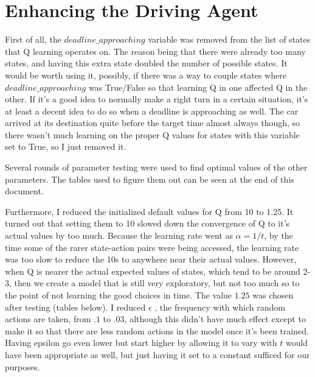 \documentclass{amsart}
\begin{document}
\section{Enhancing the Driving Agent}
First of all, the $deadline\_approaching$ variable was removed from the list of states that Q learning operates on.  The reason being that there were already too many states, and having this extra state doubled the number of possible states.  It would be worth using it, possibly, if there was a way to couple states where $deadline\_approaching$ was True/False so that learning Q in one affected Q in the other.  If it's a good idea to normally make a right turn in a certain situation, it's at least a decent idea to do so when a deadline is approaching as well.  The car arrived at its destination quite before the target time almost always though, so there wasn't much learning on the proper Q values for states with this variable set to True, so I just removed it.

Several rounds of parameter testing were used to find optimal values of the other parameters.  The tables used to figure them out can be seen at the end of this document.

Furthermore, I reduced the initialized default values for Q from 10 to 1.25.  It turned out that setting them to 10 slowed down the convergence of Q to it's actual values by too much.  Because the learning rate went as $\alpha = 1/t$, by the time some of the rarer state-action pairs were being accessed, the learning rate was too slow to reduce the 10s to anywhere near their actual values.  However, when Q is nearer the actual expected values of states, which tend to be around 2-3, then we create a model that is still very exploratory, but not too much so to the point of not learning the good choices in time.  The value $1.25$ was chosen after testing (tables below).  I reduced $\epsilon$ , the frequency with which random actions are taken, from $.1$ to $.03$, although this didn't have much effect except to make it so that there are less random actions in the model once it's been trained.  Having epsilon go even lower but start higher by allowing it to vary with $t$ would have been appropriate as well, but just having it set to a constant sufficed for our purposes.
\end{document}
